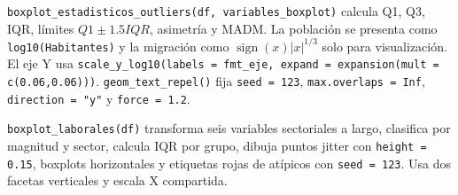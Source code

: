 \documentclass[10pt,a4paper]{article}
\newcommand{\code}[1]{\texttt{\small #1}}
\begin{document}
\code{boxplot\_estadisticos\_outliers(df, variables\_boxplot)} calcula Q1, Q3, IQR, límites $Q1\pm1.5IQR$, asimetría y MADM. La población se presenta como \code{log10(Habitantes)} y la migración como $\operatorname{sign}(x)|x|^{1/3}$ solo para visualización. El eje Y usa \code{scale\_y\_log10(labels = fmt\_eje, expand = expansion(mult = c(0.06,0.06)))}. \code{geom\_text\_repel()} fija \code{seed = 123}, \code{max.overlaps = Inf}, \code{direction = "y"} y \code{force = 1.2}.

\code{boxplot\_laborales(df)} transforma seis variables sectoriales a largo, clasifica por magnitud y sector, calcula IQR por grupo, dibuja puntos jitter con \code{height = 0.15}, boxplots horizontales y etiquetas rojas de atípicos con \code{seed = 123}. Usa dos facetas verticales y escala X compartida.
\end{document}
